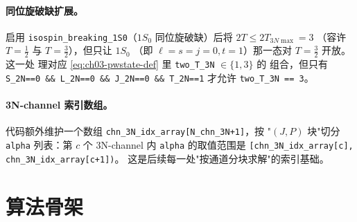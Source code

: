 \paragraph{同位旋破缺扩展。}
启用 \verb|isospin_breaking_1S0|（\(1S_0\) 同位旋破缺）后将 \(2T \le 2T_{3N\max} = 3\)
（容许 \(T = \tfrac{1}{2}\) 与 \(T = \tfrac{3}{2}\)），但只让 \(1S_0\)
（即 \(\ell = s = j = 0, t = 1\)）那一态对 \(T = \tfrac{3}{2}\) 开放。这一处
理对应 \cref{eq:ch03-pwstate-def} 里 \verb|two_T_3N| \(\in \{1, 3\}\) 的
组合，但只有 \verb|S_2N==0 && L_2N==0 && J_2N==0 && T_2N==1| 才允许
\verb|two_T_3N == 3|。

\paragraph{3N-channel 索引数组。}
代码额外维护一个数组 \verb|chn_3N_idx_array[N_chn_3N+1]|，按
"\((J, P)\) 块"切分 \verb|alpha| 列表：第 \(c\) 个 3N-channel 内
\verb|alpha| 的取值范围是 \texttt{[chn\_3N\_idx\_array[c], chn\_3N\_idx\_array[c+1])}。
这是后续每一处"按通道分块求解"的索引基础。

\section{算法骨架}
\label{sec:ch03-algorithm}

